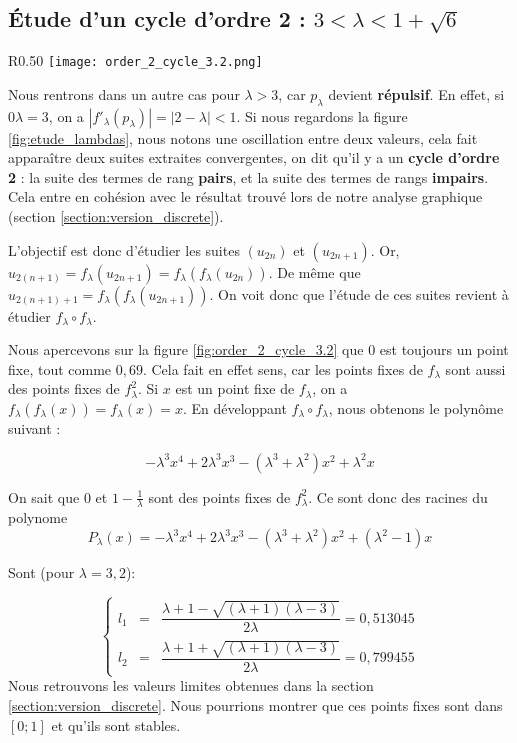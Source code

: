 \subsection{\'Etude d'un cycle d'ordre 2 : \texorpdfstring{$3 < \lambda < 1+\sqrt{6}$}{Lg}}
\begin{wrapfigure}{R}{0.50\textwidth}
    \centering
    \texttt{[image: order\_2\_cycle\_3.2.png]}
    \caption{\label{fig:order_2_cycle_3.2}$\lambda = 3,2$}
\end{wrapfigure}
Nous rentrons dans un autre cas pour $\lambda > 3$, car $p_\lambda$ devient \textbf{répulsif}. En effet, si 0$\lambda = 3$, on a $|f'_\lambda(p_\lambda)| = |2-\lambda|<1$. Si nous regardons la figure \ref{fig:etude_lambdas}, nous notons une oscillation entre deux valeurs, cela fait apparaître deux suites extraites convergentes, on dit qu'il y a un \textbf{cycle d'ordre 2} : la suite des termes de rang \textbf{pairs}, et la suite des termes de rangs \textbf{impairs}. Cela entre en cohésion avec le résultat trouvé lors de notre analyse graphique (section \ref{section:version_discrete}).

L'objectif est donc d'étudier les suites $(u_{2n})$ et $(u_{2n+1})$. Or, $u_{2(n+1)} = f_\lambda(u_{2n+1}) = f_\lambda(f_\lambda(u_{2n}))$. De même que $u_{2(n+1)+1} = f_\lambda(f_\lambda(u_{2n+1}))$. On voit donc que l'étude de ces suites revient à étudier $f_\lambda \circ f_\lambda$.

Nous apercevons sur la figure \ref{fig:order_2_cycle_3.2} que $0$ est toujours un point fixe, tout comme $0,69$. Cela fait en effet sens, car les points fixes de $f_\lambda$ sont aussi des points fixes de $f_\lambda^2$. Si $x$ est un point fixe de $f_\lambda$, on a $f_\lambda(f_\lambda(x)) = f_\lambda(x)=x$. En développant $f_\lambda \circ f_\lambda$, nous obtenons le polynôme suivant :

$$-\lambda^3x^4+2\lambda^3x^3-(\lambda^3+\lambda^2)x^2+\lambda^2x$$

On sait que $0$ et $1 - \frac{1}{\lambda}$ sont des points fixes de $f_\lambda^2$. Ce sont donc des racines du polynome
$$P_\lambda(x) = -\lambda^3x^4+2\lambda^3x^3-(\lambda^3+\lambda^2)x^2+(\lambda^2 - 1)x$$

Sont (pour $\lambda = 3,2$):

$$
    \left\{
    \begin{array}{rcl}
            l_1 &=& \dfrac{\lambda + 1 - \sqrt{(\lambda+1)(\lambda-3)}}{2\lambda} = 0,513045\\[10pt]
            l_2 &=& \dfrac{\lambda + 1 + \sqrt{(\lambda+1)(\lambda-3)}}{2\lambda} = 0,799455
    \end{array}
    \right.
$$
Nous retrouvons les valeurs limites obtenues dans la section \ref{section:version_discrete}. Nous pourrions montrer que ces points fixes sont dans $[0;1]$ et qu'ils sont stables.


